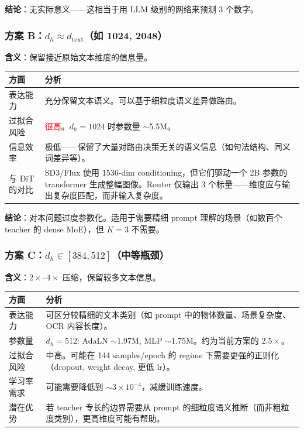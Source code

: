 \documentclass[11pt,a4paper]{article}
\begin{document}
\textbf{结论}：无实际意义——这相当于用 LLM 级别的网络来预测 3 个数字。

\subsubsection{方案 B：$d_h \approx d_{\text{text}}$（如 1024, 2048）}

\textbf{含义}：保留接近原始文本维度的信息量。

\begin{center}
\begin{tabular}{>{\raggedright}p{3cm}|p{9cm}}
\toprule
\textbf{方面} & \textbf{分析} \\
\midrule
表达能力 & 充分保留文本语义。可以基于细粒度语义差异做路由。\\
过拟合风险 & \textcolor{red}{很高}。$d_h = 1024$ 时参数量 $\sim$5.5M。\\
信息效率 & 极低——保留了大量对路由决策无关的语义信息（如句法结构、同义词差异等）。\\
与 DiT 的对比 & SD3/Flux 使用 1536-dim conditioning，但它们驱动一个 2B 参数的 transformer 生成整幅图像。Router 仅输出 3 个标量——维度应与输出复杂度匹配，而非输入复杂度。\\
\bottomrule
\end{tabular}
\end{center}

\textbf{结论}：对本问题过度参数化。适用于需要精细 prompt 理解的场景（如数百个 teacher 的 dense MoE），但 $K = 3$ 不需要。

\subsubsection{方案 C：$d_h \in [384, 512]$（中等瓶颈）}

\textbf{含义}：$2 \times$--$4 \times$ 压缩，保留较多文本信息。

\begin{center}
\begin{tabular}{>{\raggedright}p{3cm}|p{9cm}}
\toprule
\textbf{方面} & \textbf{分析} \\
\midrule
表达能力 & 可区分较精细的文本类别（如 prompt 中的物体数量、场景复杂度、OCR 内容长度）。\\
参数量 & $d_h = 512$: AdaLN $\sim$1.97M, MLP $\sim$1.75M。约为当前方案的 $2.5\times$。\\
过拟合风险 & 中高。可能在 144 samples/epoch 的 regime 下需要更强的正则化（dropout, weight decay, 更低 lr）。\\
学习率需求 & 可能需要降低到 $\sim 3 \times 10^{-4}$，减缓训练速度。\\
潜在优势 & 若 teacher 专长的边界需要从 prompt 的细粒度语义推断（而非粗粒度类别），更高维度可能有帮助。\\
\bottomrule
\end{tabular}
\end{center}
\end{document}
